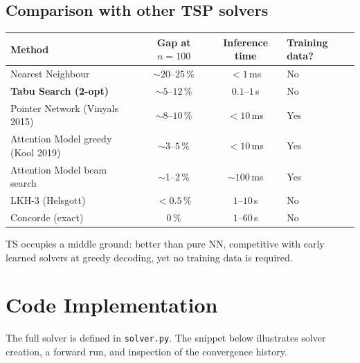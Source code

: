 \documentclass[12pt,a4paper]{article}
\begin{document}
\subsection*{Comparison with other TSP solvers}

\begin{center}
\begin{tabularx}{\linewidth}{lccX}
\toprule
\textbf{Method} & \textbf{Gap at $n=100$} & \textbf{Inference time} &
  \textbf{Training data?} \\
\midrule
Nearest Neighbour                  & ${\sim}20$--$25\,\%$ & ${<}1$\,ms  & No  \\
\textbf{Tabu Search (2-opt)}       & ${\sim}5$--$12\,\%$  & $0.1$--$1$\,s & No \\
Pointer Network (Vinyals 2015)     & ${\sim}8$--$10\,\%$  & ${<}10$\,ms  & Yes \\
Attention Model greedy (Kool 2019) & ${\sim}3$--$5\,\%$   & ${<}10$\,ms  & Yes \\
Attention Model beam search        & ${\sim}1$--$2\,\%$   & ${\sim}100$\,ms & Yes \\
LKH-3 (Helsgott)                   & ${<}0.5\,\%$         & $1$--$10$\,s & No  \\
Concorde (exact)                   & $0\,\%$              & $1$--$60$\,s & No  \\
\bottomrule
\end{tabularx}
\end{center}

TS occupies a middle ground: better than pure NN, competitive with early
learned solvers at greedy decoding, yet no training data is required.

\section{Code Implementation}

The full solver is defined in \texttt{solver.py}.
The snippet below illustrates solver creation, a forward run, and inspection
of the convergence history.
\end{document}
